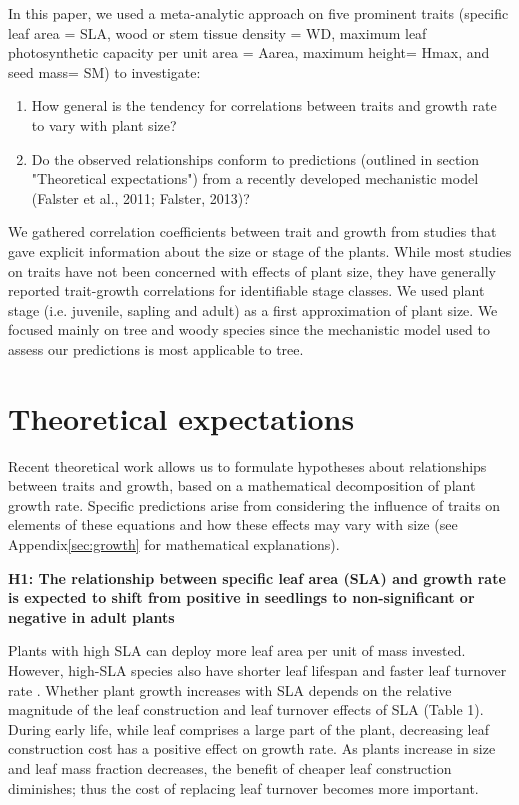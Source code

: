 \documentclass[a4paper]{article}\usepackage[]{graphicx}\usepackage[]{color}
\begin{document}
In this paper, we used a meta-analytic approach on five prominent traits (specific leaf area = SLA, wood or stem tissue density = WD, maximum leaf photosynthetic capacity per unit area = Aarea, maximum height= Hmax, and seed mass= SM) to investigate:
\begin{enumerate}
  \item How general is the tendency for correlations between traits and growth rate to vary with plant size?
  \item  Do the observed relationships conform to predictions (outlined in section "Theoretical expectations") from a recently developed mechanistic model (Falster et al., 2011; Falster, 2013)?
\end{enumerate}
We gathered correlation coefficients between trait and growth from studies that gave explicit information about the size or stage of the plants. While most studies on traits have not been concerned with effects of plant size, they have generally reported trait-growth correlations for identifiable stage classes. We used plant stage (i.e. juvenile, sapling and adult) as a first approximation of plant size. We focused mainly on tree and woody species since the mechanistic model used to assess our predictions is most applicable to tree. 

\section*{Theoretical expectations}\label{theory}

Recent theoretical work \citep{Falster:2011ii} allows us to formulate hypotheses about relationships between traits and growth, based on a mathematical decomposition of plant growth rate. Specific predictions arise from considering the influence of traits on elements of these equations and how these effects may vary with size (see Appendix\ref{sec:growth} for mathematical explanations).

\textbf{H1: The relationship between specific leaf area (SLA) and growth rate is expected to shift from positive in seedlings to non-significant or negative in adult plants}

Plants with high SLA can deploy more leaf area per unit of mass invested. However, high-SLA species also have shorter leaf lifespan and faster leaf turnover rate \citep{Wright:2004jb}. Whether plant growth increases with SLA depends on the relative magnitude of the leaf construction and leaf turnover effects of SLA (Table 1). During early life, while leaf comprises a large part of the plant, decreasing leaf construction cost has a positive effect on growth rate. As plants increase in size and leaf mass fraction decreases, the benefit of cheaper leaf construction diminishes; thus the cost of replacing leaf turnover becomes more important. 
\end{document}
